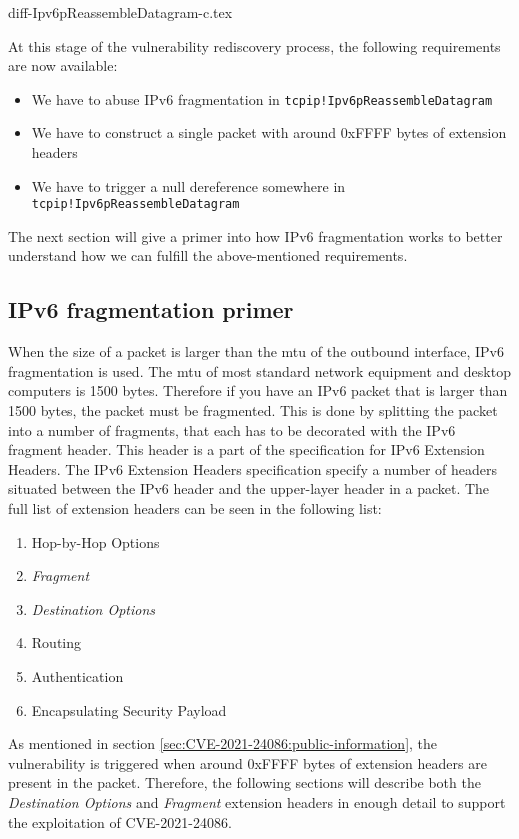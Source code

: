\documentclass{report}
\begin{document}
{diff-Ipv6pReassembleDatagram-c.tex}

At this stage of the vulnerability rediscovery process, the following requirements are now available:
\begin{itemize}
    \item We have to abuse IPv6 fragmentation in \texttt{tcpip!Ipv6pReassembleDatagram}
    \item We have to construct a single packet with around 0xFFFF bytes of extension headers
    \item We have to trigger a null dereference somewhere in \texttt{tcpip!Ipv6pReassembleDatagram}
\end{itemize}

The next section will give a primer into how IPv6 fragmentation works to better understand how we can fulfill the above-mentioned requirements.

\subsection{IPv6 fragmentation primer}
When the size of a packet is larger than the \gls{mtu} of the outbound interface, IPv6 fragmentation is used. The \gls{mtu} of most standard network equipment and desktop computers is 1500 bytes. Therefore if you have an IPv6 packet that is larger than 1500 bytes, the packet must be fragmented. This is done by splitting the packet into a number of fragments, that each has to be decorated with the IPv6 fragment header. This header is a part of the specification for IPv6 Extension Headers\cite[sec. 4.5]{url:rfc:ipv6}. The IPv6 Extension Headers specification specify a number of headers situated between the IPv6 header and the upper-layer header in a packet.
The full list of extension headers can be seen in the following list:

\begin{enumerate}
    \item Hop-by-Hop Options
    \item \emph{Fragment}
    \item \emph{Destination Options}
    \item Routing
    \item Authentication
    \item Encapsulating Security Payload
\end{enumerate}

As mentioned in section \ref{sec:CVE-2021-24086:public-information}, the vulnerability is triggered when around 0xFFFF bytes of extension headers are present in the packet. Therefore, the following sections will describe both the \emph{Destination Options} and \emph{Fragment} extension headers in enough detail to support the exploitation of CVE-2021-24086.
\end{document}
